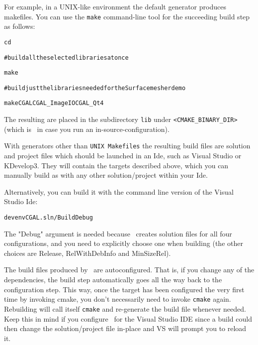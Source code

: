 For example, in a UNIX-like environment the default generator produces
makefiles. You can use the \texttt{make} command-line tool for the
succeeding build step as follows:

{\ccTexHtml{\scriptsize}{}
\begin{alltt}

cd \cgalrel

# build all the selected libraries at once

make 


# build just the libraries needed for the Surface mesher demo

make  CGAL  CGAL_ImageIO CGAL_Qt4

\end{alltt}
}

The resulting are placed in the subdirectory {\tt lib} under {\tt <CMAKE\_BINARY\_DIR>}
(which is \cgalrel\ in case you run an in-source-configuration).

With generators other than {\tt UNIX Makefiles} the resulting build files
are solution and project files which
should be launched in an {\sc Ide}, such as Visual Studio or KDevelop3. They will contain the targets described
above, which you can manually build as with any other solution/project within your {\sc Ide}.

Alternatively, you can build it with the command line version of the
{\sc Visual Studio Ide}:

{\ccTexHtml{\scriptsize}{}
\begin{alltt}

    devenv CGAL.sln /Build Debug

\end{alltt}
}

The "Debug" argument is needed because \cmake\ creates solution files for
all four configurations, and you need to explicitly choose one when building
(the other choices are Release, RelWithDebInfo and MinSizeRel).


\begin{ccAdvanced}
The build files produced by \cmake\ are autoconfigured. That is, if you change any 
of the dependencies, the build step automatically goes all the way back to
the configuration step. This way, once the target has been configured the
very first time by
invoking cmake, you don't necessarily need to invoke \texttt{cmake} again. Rebuilding will call
itself \texttt{cmake} and re-generate the build file whenever needed. Keep this in mind if you
configure \cgal\ for the Visual Studio IDE since a build could then change the solution/project 
file in-place and VS will prompt you to reload it.
\end{ccAdvanced}


